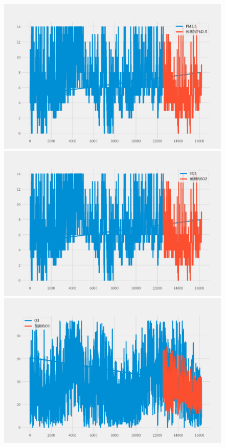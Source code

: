 \documentclass[a4paper,10pt]{my_paper}
\numberwithin{equation}{section}
\begin{document}
\begin{figure}[htbp]
\begin{minipage}[c]{0.3\textwidth}
		\end{minipage}
		\begin{minipage}[c]{0.3\textwidth}
			\centering
			\includegraphics[width=1\textwidth]{prob3/预测A地_PM2..pdf} 
		\end{minipage}
    \begin{minipage}[c]{0.3\textwidth}
			\centering
			\includegraphics[width=1\textwidth]{prob3/预测A地_SO2.pdf} 
		\end{minipage}
    \begin{minipage}[c]{0.3\textwidth}
			\centering
			\includegraphics[width=1\textwidth]{prob3/预测A地_O3.pdf} 

\end{minipage}
\end{figure}
\end{document}
